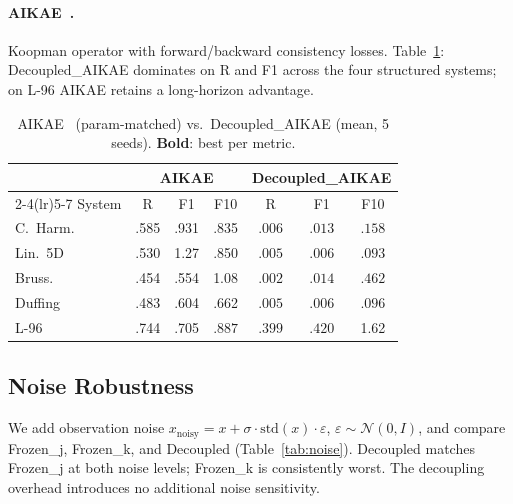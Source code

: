 \documentclass{article}
\begin{document}
\paragraph{AIKAE~\citep{li2022deep}.}
Koopman operator with forward/backward consistency losses.
Table~\ref{tab:aikae}: Decoupled\_AIKAE dominates on R and F1 across
the four structured systems; on L-96 AIKAE retains a long-horizon
advantage.

\begin{table}[H]
\caption{AIKAE~\citep{li2022deep} (param-matched) vs.\ Decoupled\_AIKAE (mean, 5 seeds).
\textbf{Bold}: best per metric.}
\label{tab:aikae}
\centering
\small
\begin{tabular}{l ccc ccc}
\toprule
& \multicolumn{3}{c}{AIKAE} & \multicolumn{3}{c}{Decoupled\_AIKAE} \\
\cmidrule(lr){2-4}\cmidrule(lr){5-7}
System & R & F1 & F10 & R & F1 & F10 \\
\midrule
C.~Harm.  & .585 & .931 & .835 & $\mathbf{.006}$ & $\mathbf{.013}$ & $\mathbf{.158}$ \\
Lin.~5D   & .530 & 1.27 & .850 & $\mathbf{.005}$ & $\mathbf{.006}$ & $\mathbf{.093}$ \\
Bruss.    & .454 & .554 & 1.08 & $\mathbf{.002}$ & $\mathbf{.014}$ & $\mathbf{.462}$ \\
Duffing   & .483 & .604 & .662 & $\mathbf{.005}$ & $\mathbf{.006}$ & $\mathbf{.096}$ \\
L-96      & .744 & .705 & $\mathbf{.887}$ & $\mathbf{.399}$ & $\mathbf{.420}$ & 1.62 \\
\bottomrule
\end{tabular}
\end{table}


\subsection{Noise Robustness}
\label{sec:noise}

We add observation noise $x_{\mathrm{noisy}} = x + \sigma \cdot
\mathrm{std}(x) \cdot \varepsilon$, $\varepsilon \sim \mathcal{N}(0,I)$,
and compare Frozen\_j, Frozen\_k, and Decoupled
(Table~\ref{tab:noise}).
Decoupled matches Frozen\_j at both noise levels; Frozen\_k is
consistently worst.  The decoupling overhead introduces no additional
noise sensitivity.
\end{document}
